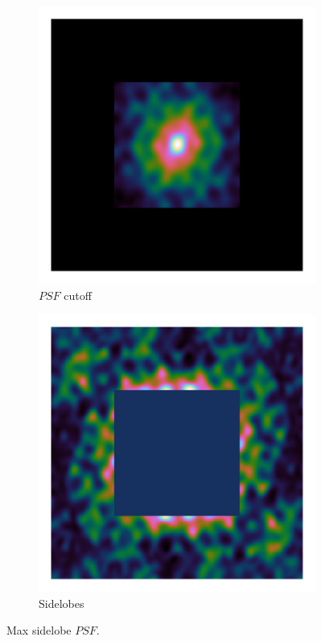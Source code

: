 \begin{figure}[h]
	\centering
	\begin{subfigure}[b]{0.3\linewidth}
		\includegraphics[width=\linewidth, trim= 0.25in 0.25in 0.25in 0.25in]{./chapters/03.cd/simulated/psfCut.png}
		\caption{$PSF$ cutoff}
	\end{subfigure}
	\begin{subfigure}[b]{0.3\linewidth}
		\includegraphics[width=\linewidth, trim= 0.25in 0.25in 0.25in 0.25in]{./chapters/03.cd/simulated/psfReverseCut.png}
		\caption{Sidelobes}
		\label{gradient:convergence:reverseCut}
	\end{subfigure}
	
	\caption{Max sidelobe $PSF$.}
	\label{gradient:convergence:sidelobe}
\end{figure}

